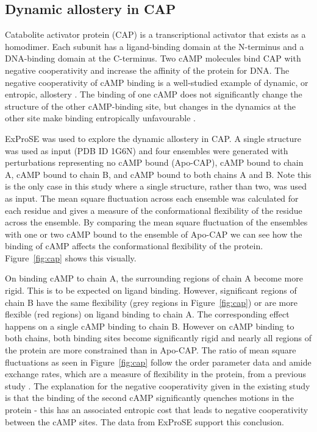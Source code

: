 \subsection{Dynamic allostery in CAP}

Catabolite activator protein (CAP) is a transcriptional activator that exists as a homodimer.
Each subunit has a ligand-binding domain at the N-terminus and a DNA-binding domain at the C-terminus.
Two cAMP molecules bind CAP with negative cooperativity and increase the affinity of the protein for DNA.
The negative cooperativity of cAMP binding is a well-studied example of dynamic, or entropic, allostery \cite{Popovych2006}.
The binding of one cAMP does not significantly change the structure of the other cAMP-binding site, but changes in the dynamics at the other site make binding entropically unfavourable \cite{Popovych2006, Louet2015}.

ExProSE was used to explore the dynamic allostery in CAP.
A single structure was used as input (PDB ID 1G6N) and four ensembles were generated with perturbations representing no cAMP bound (Apo-CAP), cAMP bound to chain A, cAMP bound to chain B, and cAMP bound to both chains A and B.
Note this is the only case in this study where a single structure, rather than two, was used as input.
The mean square fluctuation across each ensemble was calculated for each residue and gives a measure of the conformational flexibility of the residue across the ensemble.
By comparing the mean square fluctuation of the ensembles with one or two cAMP bound to the ensemble of Apo-CAP we can see how the binding of cAMP affects the conformational flexibility of the protein.
Figure~\ref{fig:cap} shows this visually.

On binding cAMP to chain A, the surrounding regions of chain A become more rigid.
This is to be expected on ligand binding.
However, significant regions of chain B have the same flexibility (grey regions in Figure~\ref{fig:cap}) or are more flexible (red regions) on ligand binding to chain A.
The corresponding effect happens on a single cAMP binding to chain B.
However on cAMP binding to both chains, both binding sites become significantly rigid and nearly all regions of the protein are more constrained than in Apo-CAP.
The ratio of mean square fluctuations as seen in Figure~\ref{fig:cap} follow the order parameter data and amide exchange rates, which are a measure of flexibility in the protein, from a previous study \cite{Popovych2006}.
The explanation for the negative cooperativity given in the existing study is that the binding of the second cAMP significantly quenches motions in the protein - this has an associated entropic cost that leads to negative cooperativity between the cAMP sites.
The data from ExProSE support this conclusion.

